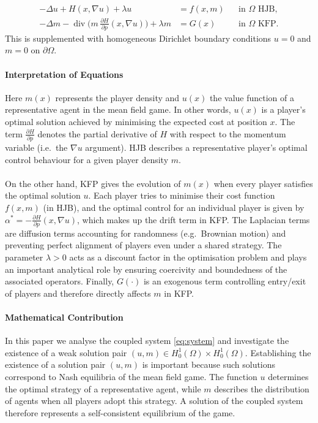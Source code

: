 \documentclass[11pt]{article}
\numberwithin{equation}{section}
\theoremstyle{definition}
\theoremstyle{remark}
\DeclareMathOperator{\diver}{div}
\newcommand{\Honez}{H_0^1(\Omega)}
\newcommand{\Hp}{\frac{\partial H}{\partial p}}
\begin{document}
\begin{equation}\label{eq:system}
\begin{aligned}
-\Delta u + H(x,\nabla u) + \lambda u &= f(x,m) && \text{in } \Omega \text{ HJB},\\
-\Delta m - \diver\!\bigl(m\,\Hp(x,\nabla u)\bigr) + \lambda m &= G(x) && \text{in } \Omega \text{ KFP}.
\end{aligned}
\end{equation}
This is supplemented with homogeneous Dirichlet boundary conditions $u=0$ and $m=0$ on $\partial\Omega$.

\paragraph{Interpretation of Equations}
Here $m(x)$ represents the player density and $u(x)$ the value function of a representative agent in the mean field game. In other words, $u(x)$ is a player's optimal solution achieved by minimising the expected cost at position $x$.
The term $\Hp$ denotes the partial derivative of $H$ with respect to the momentum variable (i.e.\ the $\nabla u$ argument).
HJB describes a representative player's optimal control behaviour for a given player density $m$. \\ \\
On the other hand, KFP gives the evolution of $m(x)$ when every player satisfies the optimal solution $u$.
Each player tries to minimise their cost function $f(x,m)$ (in HJB), and the optimal control for an individual player is given by $\alpha^\ast = -\Hp(x,\nabla u)$, which makes up the drift term in KFP.
The Laplacian terms are diffusion terms accounting for randomness (e.g.\ Brownian motion) and preventing perfect alignment of players even under a shared strategy.
The parameter $\lambda>0$ acts as a discount factor in the optimisation problem and plays an important analytical role by ensuring coercivity and boundedness of the associated operators.
Finally, $G(\cdot)$ is an exogenous term controlling entry/exit of players and therefore directly affects $m$ in KFP. \cite{lasry_lions, pierre}

\paragraph{Mathematical Contribution}
In this paper we analyse the coupled system \cref{eq:system} and investigate the existence of a weak solution pair $(u,m)\in\Honez\times\Honez$. 
Establishing the existence of a solution pair $(u,m)$ is important because such solutions correspond to Nash equilibria of the mean field game. 
The function $u$ determines the optimal strategy of a representative agent, while $m$ describes the distribution of agents when all players adopt this strategy. 
A solution of the coupled system therefore represents a self-consistent equilibrium of the game. 
\end{document}
